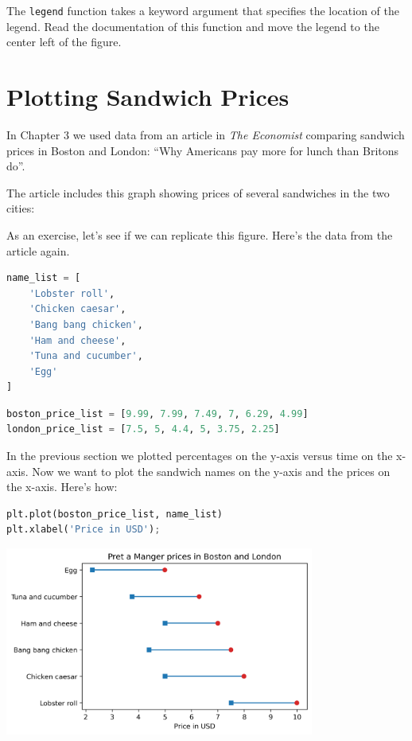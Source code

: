 The \passthrough{\lstinline!legend!} function takes a keyword argument
that specifies the location of the legend. Read the documentation of
this function and move the legend to the center left of the figure.

\section{Plotting Sandwich Prices}\label{plotting-sandwich-prices}

In Chapter 3 we used data from an article in \emph{The Economist}
comparing sandwich prices in Boston and London: ``Why Americans pay more
for lunch than Britons do''.

The article includes this graph showing prices of several sandwiches in
the two cities:

As an exercise, let's see if we can replicate this figure. Here's the
data from the article again.

\begin{lstlisting}[language=Python,style=source]
name_list = [
    'Lobster roll',
    'Chicken caesar',
    'Bang bang chicken',
    'Ham and cheese',
    'Tuna and cucumber',
    'Egg'
]
\end{lstlisting}

\begin{lstlisting}[language=Python,style=source]
boston_price_list = [9.99, 7.99, 7.49, 7, 6.29, 4.99]
london_price_list = [7.5, 5, 4.4, 5, 3.75, 2.25]
\end{lstlisting}

In the previous section we plotted percentages on the y-axis versus time
on the x-axis. Now we want to plot the sandwich names on the y-axis and
the prices on the x-axis. Here's how:

\begin{lstlisting}[language=Python,style=source]
plt.plot(boston_price_list, name_list)
plt.xlabel('Price in USD');
\end{lstlisting}

\begin{center}
\includegraphics[width=4in]{chapters/06_plotting_files/06_plotting_47_0.png}
\end{center}

